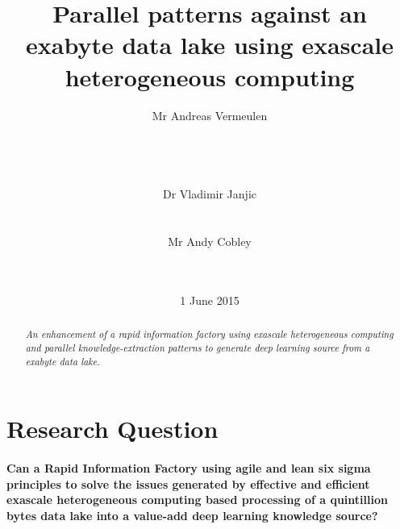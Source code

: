 \documentclass{acm_proc_article-sp}
\begin{document}
\title{Parallel patterns against an exabyte data lake using exascale heterogeneous computing}
\subtitle{}
\author{
\alignauthor
Mr Andreas Vermeulen\\
\\
\\
\\
\\
\alignauthor
Dr Vladimir Janjic\\
\\
\\
\alignauthor
Mr Andy Cobley\\
\\
\\
}
\date{1 June 2015}
\maketitle
\begin{abstract}
\textit{An enhancement of a rapid information factory using exascale heterogeneous computing and parallel knowledge-extraction patterns to generate deep learning source from a exabyte data lake.}
\end{abstract}
\section{Research Question}
\paragraph{Can a Rapid Information Factory using agile and lean six sigma principles to solve the issues generated by effective and efficient exascale heterogeneous computing based processing of a quintillion bytes data lake into a value-add deep learning knowledge source?}
\pagebreak
\end{document}
